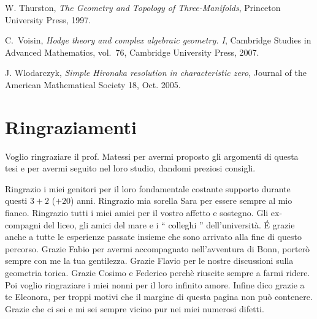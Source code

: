 \documentclass{article}
\numberwithin{equation}{section}
\begin{document}
\begin{thebibliography}{70}
 W. Thurston, \emph{The Geometry and Topology of Three-Manifolds}, Princeton University Press, 1997.
 

C.~Voisin, \emph{{H}odge theory and complex algebraic geometry. {I}}, Cambridge
  Studies in Advanced Mathematics, vol.~76, Cambridge University Press, 2007.

J. Wlodarczyk, \emph{Simple Hironaka resolution in characteristic zero}, Journal of the American Mathematical Society 18, Oct. 2005.

\end{thebibliography}



\newpage
\thispagestyle{empty}
\mbox{}
\newpage

\section*{Ringraziamenti}
Voglio ringraziare il prof. Matessi per avermi proposto gli argomenti di questa tesi e per avermi seguito nel loro studio, dandomi preziosi consigli.

Ringrazio i miei genitori per il loro fondamentale costante supporto durante questi $3+2$ ($+20$) anni. 
Ringrazio mia sorella Sara per essere sempre al mio fianco. 
Ringrazio tutti i miei amici per il vostro affetto e sostegno. 
Gli ex-compagni del liceo, gli amici del mare e i `` colleghi '' dell'università. \'E grazie anche a tutte le esperienze passate insieme che sono arrivato alla fine di questo percorso. 
Grazie Fabio per avermi accompagnato nell'avventura di Bonn, porterò sempre con me la tua gentilezza. 
Grazie Flavio per le nostre discussioni sulla geometria torica.
Grazie Cosimo e Federico perchè riuscite sempre a farmi ridere.
Poi voglio ringraziare i miei nonni per il loro infinito amore.
Infine dico grazie a te Eleonora, per troppi motivi che il margine di questa pagina non può contenere. Grazie che ci sei e mi sei sempre vicino pur nei miei numerosi difetti. 
\end{document}
